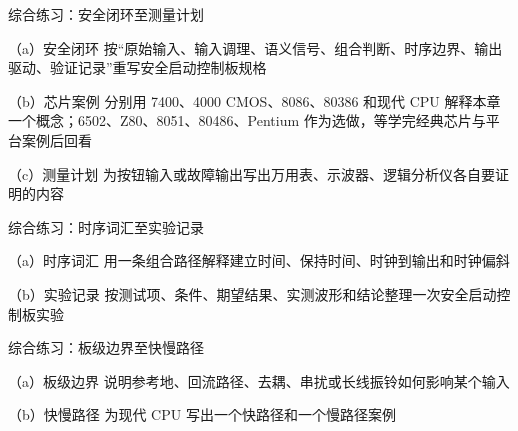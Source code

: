 \begin{chapterexercise}{综合练习：安全闭环至测量计划}
\begin{exercisesubproblem}{（a）安全闭环}
按“原始输入、输入调理、语义信号、组合判断、时序边界、输出驱动、验证记录”重写安全启动控制板规格
\end{exercisesubproblem}
\begin{exercisesubproblem}{（b）芯片案例}
分别用 7400、4000 CMOS、8086、80386 和现代 CPU 解释本章一个概念；6502、Z80、8051、80486、Pentium 作为选做，等学完经典芯片与平台案例后回看
\end{exercisesubproblem}
\begin{exercisesubproblem}{（c）测量计划}
为按钮输入或故障输出写出万用表、示波器、逻辑分析仪各自要证明的内容
\end{exercisesubproblem}
\end{chapterexercise}

\begin{chapterexercise}{综合练习：时序词汇至实验记录}
\begin{exercisesubproblem}{（a）时序词汇}
用一条组合路径解释建立时间、保持时间、时钟到输出和时钟偏斜
\end{exercisesubproblem}
\begin{exercisesubproblem}{（b）实验记录}
按测试项、条件、期望结果、实测波形和结论整理一次安全启动控制板实验
\end{exercisesubproblem}
\end{chapterexercise}

\begin{chapterexercise}{综合练习：板级边界至快慢路径}
\begin{exercisesubproblem}{（a）板级边界}
说明参考地、回流路径、去耦、串扰或长线振铃如何影响某个输入
\end{exercisesubproblem}
\begin{exercisesubproblem}{（b）快慢路径}
为现代 CPU 写出一个快路径和一个慢路径案例
\end{exercisesubproblem}
\end{chapterexercise}

